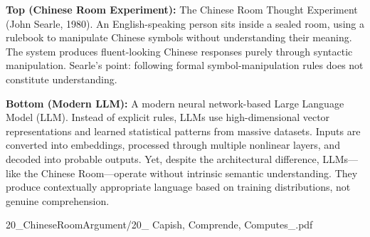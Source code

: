 \begin{SideNotePage}{
  \textbf{Top (Chinese Room Experiment):} The Chinese Room Thought Experiment (John Searle, 1980). An English-speaking person sits inside a sealed room, using a rulebook to manipulate Chinese symbols without understanding their meaning. The system produces fluent-looking Chinese responses purely through syntactic manipulation. Searle’s point: following formal symbol-manipulation rules does not constitute understanding. \par
  \textbf{Bottom (Modern LLM):} A modern neural network-based Large Language Model (LLM). Instead of explicit rules, LLMs use high-dimensional vector representations and learned statistical patterns from massive datasets. Inputs are converted into embeddings, processed through multiple nonlinear layers, and decoded into probable outputs. Yet, despite the architectural difference, LLMs—like the Chinese Room—operate without intrinsic semantic understanding. They produce contextually appropriate language based on training distributions, not genuine comprehension.
}{20_ChineseRoomArgument/20_ Capish, Comprende, Computes_.pdf}
\end{SideNotePage}
